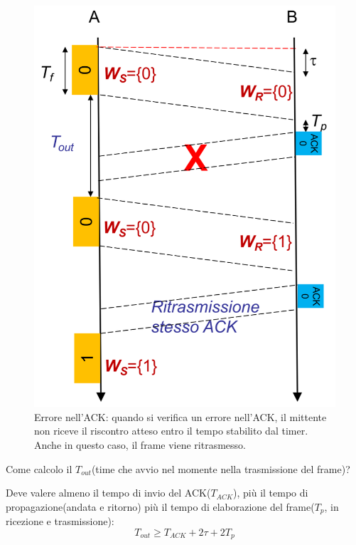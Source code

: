 \begin{figure}[htbp]
\begin{minipage}{0.44\textwidth}
    \end{minipage}%
    \hfill
    \begin{minipage}{0.48\textwidth}
        \includegraphics[width=\linewidth]{images/erroreack.png}
        \caption{Errore nell'ACK: quando si verifica un errore nell'ACK, il mittente non riceve il riscontro atteso entro il tempo stabilito dal timer. 
        Anche in questo caso, il frame viene ritrasmesso. }
    \end{minipage}
\end{figure}

Come calcolo il $T_{out}$(time che avvio nel momente nella trasmissione del frame)?

Deve valere almeno il tempo di invio del ACK($T_{ACK}$), più il tempo di propagazione(andata e ritorno) più il tempo di elaborazione del frame($T_p$, in ricezione e trasmissione):
\begin{equation}
T_{out} \geq T_{ACK} + 2\tau + 2T_p
\end{equation}

